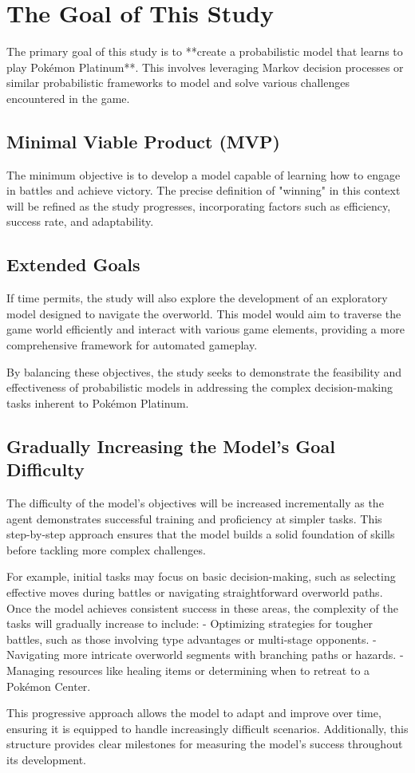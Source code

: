 \chapter{The Goal of This Study}

The primary goal of this study is to **create a probabilistic model that learns to play Pokémon Platinum**. This involves leveraging Markov decision processes or similar probabilistic frameworks to model and solve various challenges encountered in the game.

\section{Minimal Viable Product (MVP)}
The minimum objective is to develop a model capable of learning how to engage in battles and achieve victory. The precise definition of "winning" in this context will be refined as the study progresses, incorporating factors such as efficiency, success rate, and adaptability.

\section{Extended Goals}
If time permits, the study will also explore the development of an exploratory model designed to navigate the overworld. This model would aim to traverse the game world efficiently and interact with various game elements, providing a more comprehensive framework for automated gameplay.

By balancing these objectives, the study seeks to demonstrate the feasibility and effectiveness of probabilistic models in addressing the complex decision-making tasks inherent to Pokémon Platinum.

\section{Gradually Increasing the Model's Goal Difficulty}

The difficulty of the model's objectives will be increased incrementally as the agent demonstrates successful training and proficiency at simpler tasks. This step-by-step approach ensures that the model builds a solid foundation of skills before tackling more complex challenges.

For example, initial tasks may focus on basic decision-making, such as selecting effective moves during battles or navigating straightforward overworld paths. Once the model achieves consistent success in these areas, the complexity of the tasks will gradually increase to include:
- Optimizing strategies for tougher battles, such as those involving type advantages or multi-stage opponents.
- Navigating more intricate overworld segments with branching paths or hazards.
- Managing resources like healing items or determining when to retreat to a Pokémon Center.

This progressive approach allows the model to adapt and improve over time, ensuring it is equipped to handle increasingly difficult scenarios. Additionally, this structure provides clear milestones for measuring the model’s success throughout its development.